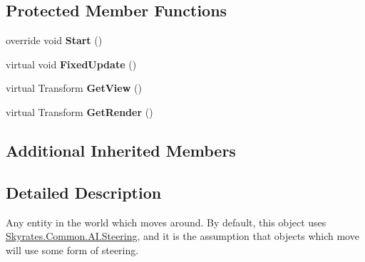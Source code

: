 \subsection*{Protected Member Functions}
\begin{DoxyCompactItemize}
\item 
\hypertarget{class_skyrates_1_1_common_1_1_entity_1_1_entity_dynamic_a0e3f4c361734de124f27ed7d331bd12c}{override void {\bfseries Start} ()}\label{class_skyrates_1_1_common_1_1_entity_1_1_entity_dynamic_a0e3f4c361734de124f27ed7d331bd12c}

\item 
\hypertarget{class_skyrates_1_1_common_1_1_entity_1_1_entity_dynamic_adc9f4729654d4c86a404c0ccd966ccd3}{virtual void {\bfseries Fixed\-Update} ()}\label{class_skyrates_1_1_common_1_1_entity_1_1_entity_dynamic_adc9f4729654d4c86a404c0ccd966ccd3}

\item 
\hypertarget{class_skyrates_1_1_common_1_1_entity_1_1_entity_dynamic_a7d214d221e4933f54528a707da1cc129}{virtual Transform {\bfseries Get\-View} ()}\label{class_skyrates_1_1_common_1_1_entity_1_1_entity_dynamic_a7d214d221e4933f54528a707da1cc129}

\item 
\hypertarget{class_skyrates_1_1_common_1_1_entity_1_1_entity_dynamic_ad59c47f109bef0238b5303646a59e430}{virtual Transform {\bfseries Get\-Render} ()}\label{class_skyrates_1_1_common_1_1_entity_1_1_entity_dynamic_ad59c47f109bef0238b5303646a59e430}

\end{DoxyCompactItemize}
\subsection*{Additional Inherited Members}


\subsection{Detailed Description}
Any entity in the world which moves around. By default, this object uses \hyperlink{class_skyrates_1_1_common_1_1_a_i_1_1_steering}{Skyrates.\-Common.\-A\-I.\-Steering}, and it is the assumption that objects which move will use some form of steering. 




